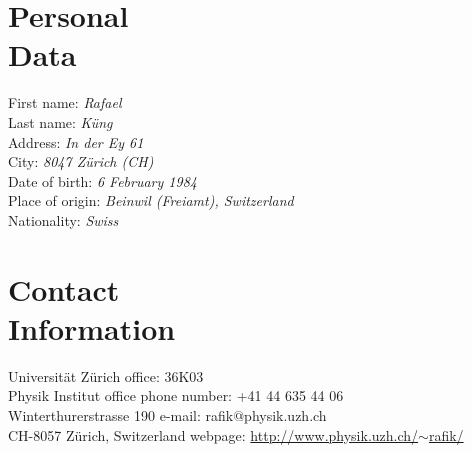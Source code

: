 \documentclass[margin,line]{resume}
\begin{document}
\begin{resume}

\section{\mysidestyle Personal\\Data}

First name:           \emph{Rafael}\\
Last name:            \emph{Küng}\\
Address:              \emph{In der Ey 61}\\
City:                 \emph{8047 Zürich (CH)}\\
Date of birth:        \emph{6 February 1984}\\
Place of origin:      \emph{Beinwil (Freiamt), Switzerland}\\
Nationality:          \emph{Swiss}

\section{\mysidestyle Contact\\Information}

Universität Zürich                \hfill office: 36K03                              \\%
Physik Institut                   \hfill office phone number: +41 44 635 44 06      \\%
Winterthurerstrasse 190           \hfill e-mail: rafik$@$physik.uzh.ch              \\%
CH-8057 Z\"urich, Switzerland     \hfill webpage:
                                        \href{http://www.physik.uzh.ch/~rafik/}{http://www.physik.uzh.ch/$\sim$rafik/}




\end{resume}
\end{document}
